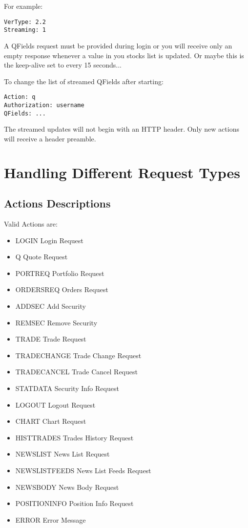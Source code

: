 \documentclass[12pt,twoside,letterpaper]{report}
\begin{document}
For example:
\begin{verbatim}
VerType: 2.2
Streaming: 1
\end{verbatim}

A QFields request must be provided during login or you will receive only an empty response whenever a value in you stocks list is updated. Or maybe this is the keep-alive set to every 15 seconds...

To change the list of streamed QFields after starting:
\begin{verbatim}
Action: q
Authorization: username
QFields: ...
\end{verbatim}

The streamed updates will not begin with an HTTP header. Only new actions will receive a header preamble.

\chapter*{Handling Different Request Types}
\section*{Actions Descriptions}
Valid Actions are:
\begin{itemize}
\item LOGIN Login Request
\item Q Quote Request
\item PORTREQ Portfolio Request
\item ORDERSREQ Orders Request
\item ADDSEC Add Security
\item REMSEC Remove Security
\item TRADE Trade Request
\item TRADECHANGE Trade Change Request
\item TRADECANCEL Trade Cancel Request
\item STATDATA Security Info Request
\item LOGOUT Logout Request
\item CHART Chart Request
\item HISTTRADES Trades History Request
\item NEWSLIST News List Request
\item NEWSLISTFEEDS News List Feeds Request
\item NEWSBODY News Body Request
\item POSITIONINFO Position Info Request
\item ERROR Error Message
\end{itemize}
\end{document}
